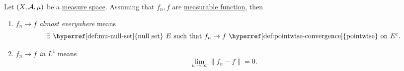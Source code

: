 \begin{definition}\label{def:converge-almost-everywhere}\label{def:converge-in-L-1}
	Let \((X, \mathcal{\MakeUppercase{a}} , \mu )\) be a \hyperref[def:measure-space]{measure space}. Assuming that \(f_{n}, f\) are \hyperref[def:measurable-function]{measurable function},
	then
	\begin{enumerate}
		\item \emph{\(f_{n}\to f\) almost everywhere} means
		      \[
			      \exists \text{ \hyperref[def:mu-null-set]{null set} } E\text{ such that } f_{n}\to f \text{ \hyperref[def:pointwise-convergence]{pointwise} on } E^{c}.
		      \]
		\item \emph{\(f_{n}\to f\) in \(L^1\)} means
		      \[
			      \lim\limits_{n \to \infty} \left\lVert f_{n} - f\right\rVert = 0.
		      \]
	\end{enumerate}
\end{definition}
